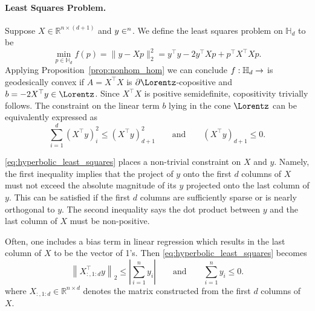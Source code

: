 \documentclass[twoside,11pt]{article}
\begin{document}
\paragraph{Least Squares Problem.}
Suppose $X \in \mathbb{R}^{n \times (d+1)}$ and $y \in \real^{n}$. We define the least squares problem on $\mathbb{H}_d$ to be 
\[
\min_{p \in \mathbb{H}_d}f(p) = \|y - Xp\|_2^2 = y^\top y - 2y^\top X p + p^\top X^\top X p.
\]
Applying Proposition~\ref{prop:nonhom_hom} we can conclude $f:\mathbb{H}_d \to \real$ is geodesically convex if $A = X^\top X$ is $\partial \Lorentz$-copositive and $b=-2X^\top y \in \Lorentz$. Since $X^\top X$ is positive semidefinite, copositivity trivially follows. The constraint on the linear term $b$ lying in the cone $\Lorentz$ can be equivalently expressed as 
\begin{equation}\label{eq:hyperbolic_least_squares}
    \sum_{i=1}^d \left(X^\top y\right)_i^2 \leq \left(X^\top y\right)_{d+1}^2 \qquad \text{and} \qquad \left(X^\top y\right)_{d+1} \leq 0.
\end{equation}

\eqref{eq:hyperbolic_least_squares} places a non-trivial constraint on $X$ and $y$. Namely, the first inequality implies that the project of $y$ onto the first $d$ columns of $X$ must not exceed the absolute magnitude of its $y$ projected onto the last column of $y.$ This can be satisfied if the first $d$ columns are sufficiently sparse or is nearly orthogonal to $y$. The second inequality says the dot product between $y$ and the last column of $X$ must be non-positive.

Often, one includes a bias term in linear regression which results in the last column of $X$ to be the vector of 1's. Then \eqref{eq:hyperbolic_least_squares} becomes 
\begin{equation}
     \left \|X_{:, 1:d}^\top y \right \|_2 \leq \left | \sum_{i=1}^n y_i \right | \qquad \text{and} \qquad \sum_{i=1}^n y_i \leq 0.
\end{equation}
where $X_{:, 1:d} \in \mathbb{R}^{n \times d}$ denotes the matrix constructed from the first $d$ columns of $X$.







\end{document}
